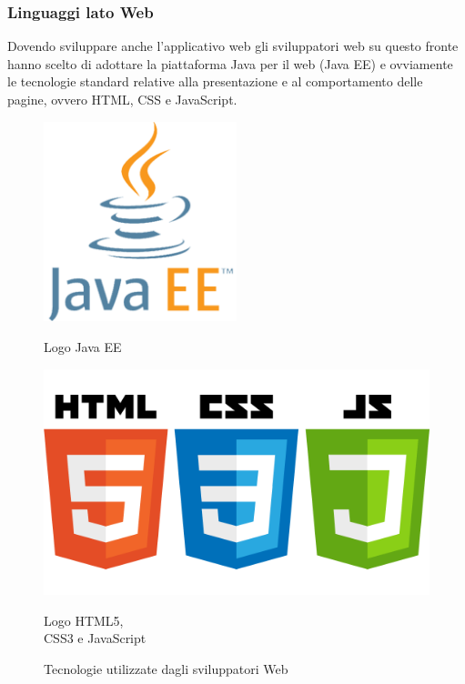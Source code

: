 	\subsubsection{Linguaggi lato Web}

	Dovendo sviluppare anche l'applicativo web gli sviluppatori web su questo
fronte hanno scelto di adottare la piattaforma Java per il web (Java EE) e ovviamente le tecnologie standard relative alla presentazione e al comportamento delle pagine, ovvero HTML, CSS e JavaScript.\\

\begin{figure}[htbp]
\centering
\begin{minipage}[c]{.40\textwidth}
\centering\setlength{\captionmargin}{0pt}%
\includegraphics[width=0.5\textwidth]{immagini/JavaEE}
\caption{Logo Java EE}
\end{minipage}%
\begin{minipage}[c]{.40\textwidth}
\centering\setlength{\captionmargin}{0pt}%
\includegraphics[width=1\textwidth]{immagini/HTML5_CSS_JavaScript}
\caption{Logo HTML5,\\CSS3 e JavaScript}
\end{minipage}
\caption{Tecnologie utilizzate dagli sviluppatori Web}
\end{figure}


